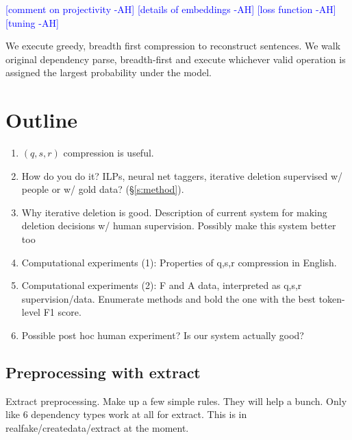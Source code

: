 \documentclass[11pt,a4paper]{article}
\newcommand{\ahcomment}[1]{\textcolor{blue}{[#1 -AH]}}
\begin{document}
\ahcomment{comment on projectivity}
\ahcomment{details of embeddings}
\ahcomment{loss function}
\ahcomment{tuning}


We execute greedy, breadth first compression to reconstruct sentences. We walk original dependency parse, breadth-first and execute whichever valid operation is assigned the largest probability under the model.


\section{Outline}
\begin{enumerate}
\item{$(q,s,r)$ compression is useful.}
\item{How do you do it? ILPs, neural net taggers, iterative deletion supervised w/ people or w/ gold data? (\S\ref{s:method}).}
\item{Why iterative deletion is good. Description of current system for making deletion decisions w/ human supervision. Possibly make this system better too}
\item{Computational experiments (1): Properties of q,s,r compression in English. }
\item{Computational experiments (2): F and A data, interpreted as q,s,r supervision/data. Enumerate methods and bold the one with the best token-level F1 score.}
\item{Possible post hoc human experiment? Is our system actually good?}
\end{enumerate}



\subsection{Preprocessing with extract}
Extract preprocessing. Make up a few simple rules. They will help a bunch. Only like 6 dependency types work at all for extract. This is in realfake/createdata/extract at the moment.
\end{document}
